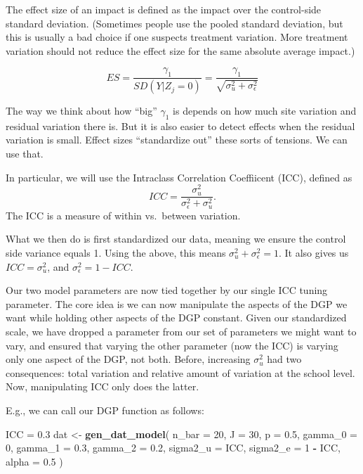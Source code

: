 \documentclass[
]{book}
\newenvironment{Shaded}{\begin{snugshade}}{\end{snugshade}}
\newcommand{\AttributeTok}[1]{\textcolor[rgb]{0.13,0.29,0.53}{#1}}
\newcommand{\DecValTok}[1]{\textcolor[rgb]{0.00,0.00,0.81}{#1}}
\newcommand{\FloatTok}[1]{\textcolor[rgb]{0.00,0.00,0.81}{#1}}
\newcommand{\FunctionTok}[1]{\textcolor[rgb]{0.13,0.29,0.53}{\textbf{#1}}}
\newcommand{\NormalTok}[1]{#1}
\newcommand{\OtherTok}[1]{\textcolor[rgb]{0.56,0.35,0.01}{#1}}
\newcommand{\SpecialCharTok}[1]{\textcolor[rgb]{0.81,0.36,0.00}{\textbf{#1}}}
\begin{document}
The effect size of an impact is defined as the impact over the control-side standard deviation.
(Sometimes people use the pooled standard deviation, but this is usually a bad choice if one suspects treatment variation. More treatment variation should not reduce the effect size for the same absolute average impact.)

\[ ES = \frac{\gamma_1}{SD( Y | Z_j = 0 )} = \frac{\gamma_1}{\sqrt{ \sigma^2_u + \sigma^2_\epsilon } } \]

The way we think about how ``big'' \(\gamma_1\) is depends on how much site variation and residual variation there is.
But it is also easier to detect effects when the residual variation is small.
Effect sizes ``standardize out'' these sorts of tensions. We can use that.

In particular, we will use the Intraclass Correlation Coeffiicent (ICC), defined as
\[ ICC = \frac{ \sigma^2_u }{ \sigma^2_\epsilon + \sigma^2_u } . \]
The ICC is a measure of within vs.~between variation.

What we then do is first standardized our data, meaning we ensure the control side variance equals 1.
Using the above, this means \(\sigma^2_u + \sigma^2_\epsilon = 1\).
It also gives us \(ICC = \sigma^2_u\), and \(\sigma^2_\epsilon = 1 - ICC\).

Our two model parameters are now tied together by our single ICC tuning parameter.
The core idea is we can now manipulate the aspects of the DGP we want while holding other aspects of the DGP constant.
Given our standardized scale, we have dropped a parameter from our set of parameters we might want to vary, and ensured that varying the other parameter (now the ICC) is varying only one aspect of the DGP, not both.
Before, increasing \(\sigma^2_u\) had two consequences: total variation and relative amount of variation at the school level.
Now, manipulating ICC only does the latter.

E.g., we can call our DGP function as follows:

\begin{Shaded}
\begin{Highlighting}[]
\NormalTok{ICC }\OtherTok{=} \FloatTok{0.3}
\NormalTok{dat }\OtherTok{\textless{}{-}} \FunctionTok{gen\_dat\_model}\NormalTok{( }\AttributeTok{n\_bar =} \DecValTok{20}\NormalTok{, }\AttributeTok{J =} \DecValTok{30}\NormalTok{, }\AttributeTok{p =} \FloatTok{0.5}\NormalTok{,}
                      \AttributeTok{gamma\_0 =} \DecValTok{0}\NormalTok{, }\AttributeTok{gamma\_1 =} \FloatTok{0.3}\NormalTok{, }\AttributeTok{gamma\_2 =} \FloatTok{0.2}\NormalTok{,}
                      \AttributeTok{sigma2\_u =}\NormalTok{ ICC, }\AttributeTok{sigma2\_e =} \DecValTok{1} \SpecialCharTok{{-}}\NormalTok{ ICC,}
                      \AttributeTok{alpha =} \FloatTok{0.5}\NormalTok{ )}
\end{Highlighting}
\end{Shaded}
\end{document}
